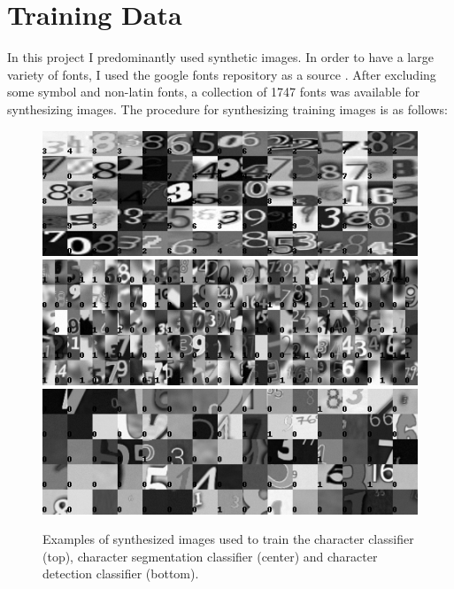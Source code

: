 \documentclass[11pt]{article}
\begin{document}
\section{Training Data}
In this project I predominantly used synthetic images. In order to have a large variety of fonts,
I used the google fonts repository as a source \cite{googlefo53:online}. After excluding some
symbol and non-latin fonts, a collection of 1747 fonts was available for synthesizing images.
The procedure for synthesizing training images is as follows:

\begin{figure}[ht!]
  \centering
  \includegraphics[width=1.0\linewidth]{fig/training_example_images/classifier}
  \includegraphics[width=1.0\linewidth]{fig/training_example_images/segmentation}
  \includegraphics[width=1.0\linewidth]{fig/training_example_images/detection}
  \caption
  {
    Examples of synthesized images used to train the character classifier (top),
    character segmentation classifier (center) and character detection classifier (bottom).
  }
  \label{fig:training_images}
\end{figure}
\end{document}
